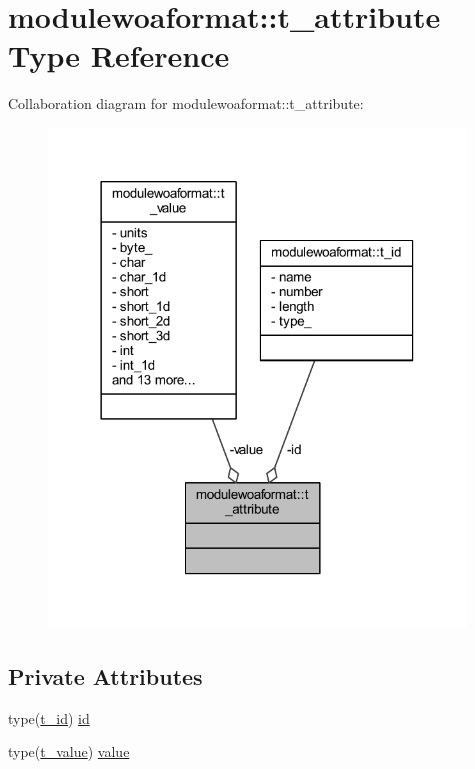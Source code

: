 \hypertarget{structmodulewoaformat_1_1t__attribute}{}\section{modulewoaformat\+:\+:t\+\_\+attribute Type Reference}
\label{structmodulewoaformat_1_1t__attribute}


Collaboration diagram for modulewoaformat\+:\+:t\+\_\+attribute\+:\nopagebreak
\begin{figure}[H]
\begin{center}
\leavevmode
\includegraphics[width=314pt]{structmodulewoaformat_1_1t__attribute__coll__graph}
\end{center}
\end{figure}
\subsection*{Private Attributes}
\begin{DoxyCompactItemize}
\item 
type(\mbox{\hyperlink{structmodulewoaformat_1_1t__id}{t\+\_\+id}}) \mbox{\hyperlink{structmodulewoaformat_1_1t__attribute_aa0124da484fe72fc4239e79708aefe82}{id}}
\item 
type(\mbox{\hyperlink{structmodulewoaformat_1_1t__value}{t\+\_\+value}}) \mbox{\hyperlink{structmodulewoaformat_1_1t__attribute_a114c8fde3dc2a2ea25f00197162221a3}{value}}
\end{DoxyCompactItemize}


